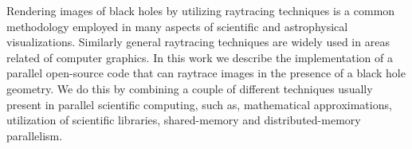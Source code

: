 Rendering images of black holes by utilizing raytracing techniques is a common
methodology employed in many aspects of scientific and astrophysical visualizations.
Similarly general raytracing techniques are widely used in areas related of computer graphics.
In this work we describe the implementation of a parallel open-source code that can raytrace images in the presence of a black hole geometry.
We do this by combining a couple of different techniques usually present in parallel scientific computing,
such as, mathematical approximations, utilization of scientific libraries, shared-memory and distributed-memory parallelism.

